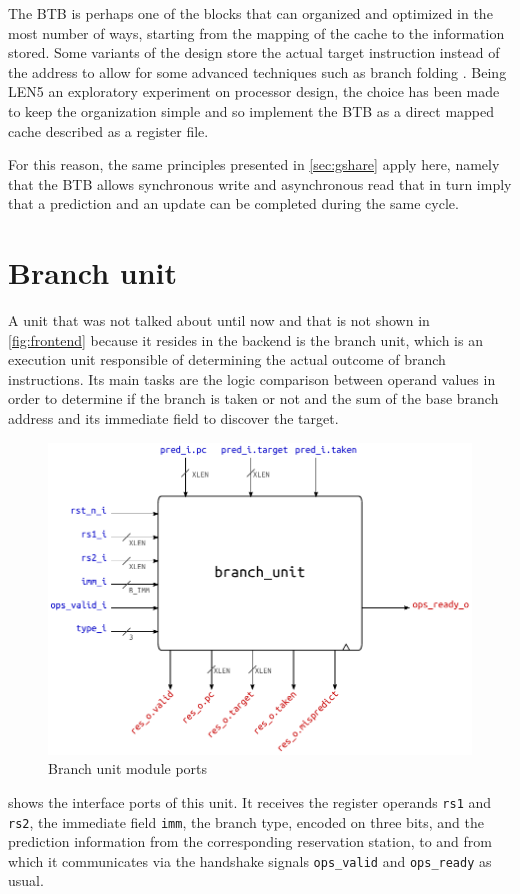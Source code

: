 \pagebreak
The \ac{BTB} is perhaps one of the blocks that can organized and optimized in the most number of ways, starting from the mapping of the cache to the information stored. Some variants of the design store the actual target instruction instead of the address to allow for some advanced techniques such as branch folding \cite{perleberg93}. Being LEN5 an exploratory experiment on processor design, the choice has been made to keep the organization simple and so implement the \ac{BTB} as a direct mapped cache described as a register file.

For this reason, the same principles presented in \cref{sec:gshare} apply here, namely that the \ac{BTB} allows synchronous write and asynchronous read that in turn imply that a prediction and an update can be completed during the same cycle.
\pagebreak
\section{Branch unit}
A unit that was not talked about until now and that is not shown in \cref{fig:frontend} because it resides in the backend is the branch unit, which is an execution unit responsible of determining the actual outcome of branch instructions. Its main tasks are the logic comparison between operand values in order to determine if the branch is taken or not and the sum of the base branch address and its immediate field to discover the target.

\begin{figure}[hbt]
  \centering
  \includegraphics[width=.9\textwidth]{img/branch_unit-top.pdf}
  \caption{Branch unit module ports}
  \label{fig:branch_unit-top}
\end{figure}
 shows the interface ports of this unit. It receives the register operands \texttt{rs1} and \texttt{rs2}, the immediate field \texttt{imm}, the branch type, encoded on three bits, and the prediction information from the corresponding reservation station, to and from which it communicates via the handshake signals \texttt{ops\_valid} and \texttt{ops\_ready} as usual.

